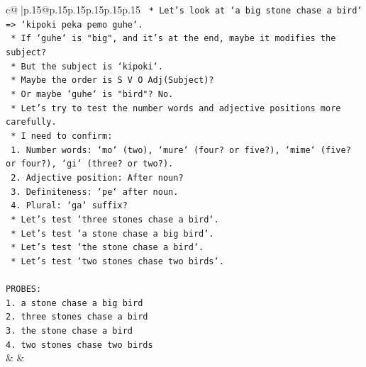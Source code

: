 \documentclass{article}
\begin{document}
{\begin{supertabular}{c@{$\;$}|p{.15\linewidth}@{}p{.15\linewidth}p{.15\linewidth}p{.15\linewidth}p{.15\linewidth}p{.15\linewidth}}
{{{\texttt{                                            *   Let's look at `a big stone chase a bird` => `kipoki peka pemo guhe`.} \\
\texttt{                                            *   If `guhe` is "big", and it's at the end, maybe it modifies the subject?} \\
\texttt{                                            *   But the subject is `kipoki`.} \\
\texttt{                                            *   Maybe the order is S V O Adj(Subject)?} \\
\texttt{                                            *   Or maybe `guhe` is "bird"? No.} \\
\texttt{                                            *   Let's try to test the number words and adjective positions more carefully.} \\
\texttt{                                            *   I need to confirm:} \\
\texttt{                                                1.  Number words: `mo` (two), `mure` (four? or five?), `mime` (five? or four?), `gi` (three? or two?).} \\
\texttt{                                                2.  Adjective position: After noun?} \\
\texttt{                                                3.  Definiteness: `pe` after noun.} \\
\texttt{                                                4.  Plural: `ga` suffix?} \\
\texttt{                                            *   Let's test `three stones chase a bird`.} \\
\texttt{                                            *   Let's test `a stone chase a big bird`.} \\
\texttt{                                            *   Let's test `the stone chase a bird`.} \\
\texttt{                                            *   Let's test `two stones chase two birds`.} \\
\\ 
\texttt{PROBES:} \\
\texttt{1. a stone chase a big bird} \\
\texttt{2. three stones chase a bird} \\
\texttt{3. the stone chase a bird} \\
\texttt{4. two stones chase two birds} \\
            }
        }
    }
    & & \\ \\


\end{supertabular}}
\end{document}
